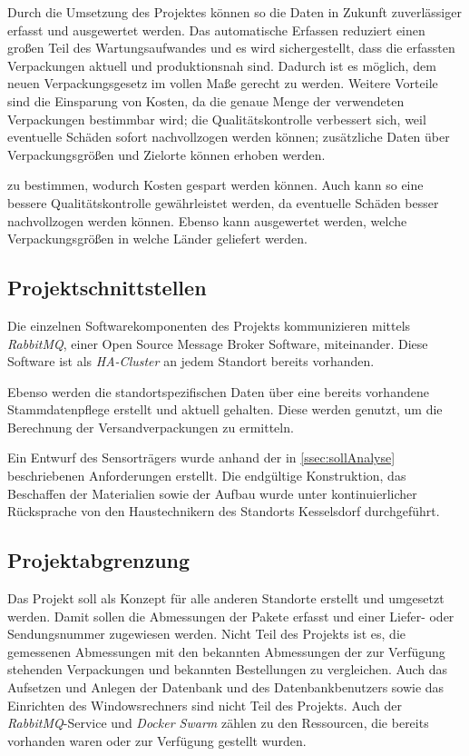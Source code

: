 Durch die Umsetzung des Projektes können so die Daten in Zukunft zuverlässiger erfasst und ausgewertet werden. Das automatische Erfassen reduziert einen großen Teil des Wartungsaufwandes und es wird sichergestellt, dass die erfassten Verpackungen aktuell und produktionsnah sind. Dadurch ist es möglich, dem neuen Verpackungsgesetz im vollen Maße gerecht zu werden. Weitere Vorteile sind die Einsparung von Kosten, da die genaue Menge der verwendeten Verpackungen bestimmbar wird; die Qualitätskontrolle verbessert sich, weil eventuelle Schäden sofort nachvollzogen werden können; zusätzliche Daten über Verpackungsgrößen und Zielorte können erhoben werden.


zu bestimmen, wodurch Kosten gespart werden können. Auch kann so eine bessere Qualitätskontrolle gewährleistet werden, da eventuelle Schäden besser nachvollzogen werden können. Ebenso kann ausgewertet werden, welche Verpackungsgrößen in welche Länder geliefert werden.


\subsection{Projektschnittstellen}

Die einzelnen Softwarekomponenten des Projekts kommunizieren mittels \textit{\gls{RabbitMQ}}, einer Open Source Message Broker Software, miteinander. Diese Software ist als \textit{\gls{HA-Cluster}} an jedem Standort bereits vorhanden.

Ebenso werden die standortspezifischen Daten über eine bereits vorhandene Stammdatenpflege erstellt und aktuell gehalten. Diese werden genutzt, um die Berechnung der Versandverpackungen zu ermitteln.

Ein Entwurf des Sensorträgers wurde anhand der in \vref{ssec:sollAnalyse} beschriebenen Anforderungen erstellt. Die endgültige Konstruktion, das Beschaffen der Materialien sowie der Aufbau wurde unter kontinuierlicher Rücksprache von den Haustechnikern des Standorts Kesselsdorf durchgeführt.


\subsection{Projektabgrenzung}

Das Projekt soll als Konzept für alle anderen Standorte erstellt und umgesetzt werden. Damit sollen die Abmessungen der Pakete erfasst und einer Liefer- oder Sendungsnummer zugewiesen werden. Nicht Teil des Projekts ist es, die gemessenen Abmessungen mit den bekannten Abmessungen der zur Verfügung stehenden Verpackungen und bekannten Bestellungen zu vergleichen. Auch das Aufsetzen und Anlegen der Datenbank und des Datenbankbenutzers sowie das Einrichten des Windowsrechners sind nicht Teil des Projekts. Auch der \textit{\gls{RabbitMQ}}-Service und \textit{\gls{Docker Swarm}} zählen zu den Ressourcen, die bereits vorhanden waren oder zur Verfügung gestellt wurden.